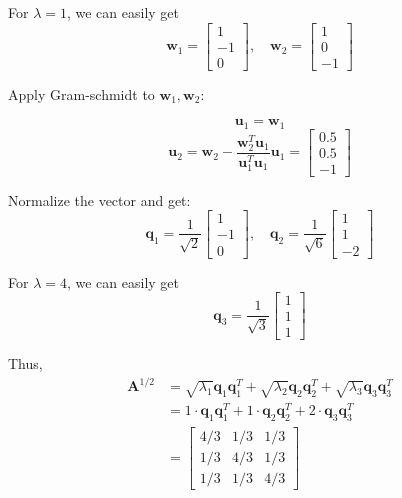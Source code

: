 \documentclass{article}
\newcommand{\0}{{\mathbf{0}}} %
\begin{document}
For $\lambda = 1$, we can easily get
$$
\mathbf{w}_1 =
\begin{bmatrix} 1 \\ -1 \\ 0
\end{bmatrix}, \quad \mathbf{w}_2 =
\begin{bmatrix} 1 \\ 0 \\ -1
\end{bmatrix}
$$

Apply Gram-schmidt to $\mathbf{w}_1,\mathbf{w}_2$:

$$\mathbf{u}_1 = \mathbf{w}_1$$
$$
\mathbf{u}_2
= \mathbf{w}_2 - \frac{\mathbf{w}_2^T \mathbf{u}_1}{\mathbf{u}_1^T \mathbf{u}_1} \mathbf{u}_1
=
\begin{bmatrix} 0.5 \\ 0.5 \\ -1
\end{bmatrix}
$$

Normalize the vector and get:
$$
\mathbf{q}_1 = \frac{1}{\sqrt{2}}
\begin{bmatrix} 1 \\ -1 \\ 0
\end{bmatrix},
\quad
\mathbf{q}_2 = \frac{1}{\sqrt{6}}
\begin{bmatrix} 1 \\ 1 \\ -2
\end{bmatrix}
$$

For $\lambda = 4$, we can easily get
$$\mathbf{q}_3 = \frac{1}{\sqrt{3}}
\begin{bmatrix} 1 \\ 1 \\ 1
\end{bmatrix}$$

Thus,
\begin{align*}
\mathbf{A}^{1/2} &= \sqrt{\lambda_1} \mathbf{q}_1 \mathbf{q}_1^T + \sqrt{\lambda_2} \mathbf{q}_2 \mathbf{q}_2^T + \sqrt{\lambda_3} \mathbf{q}_3 \mathbf{q}_3^T \\
&= 1 \cdot \mathbf{q}_1 \mathbf{q}_1^T + 1 \cdot \mathbf{q}_2 \mathbf{q}_2^T + 2 \cdot \mathbf{q}_3 \mathbf{q}_3^T  \\
&=
\begin{bmatrix} 4/3 & 1/3 & 1/3 \\ 1/3 & 4/3 & 1/3 \\ 1/3 & 1/3 & 4/3
\end{bmatrix}
\end{align*}
\end{document}
